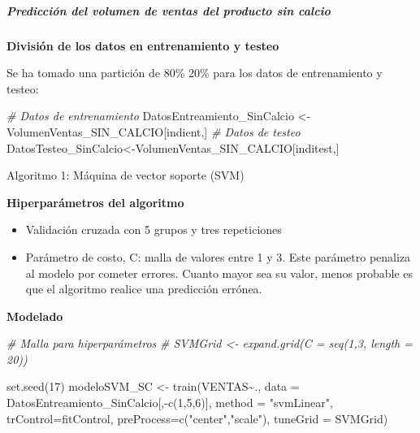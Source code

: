 \documentclass[
]{article}
\newenvironment{Shaded}{\begin{snugshade}}{\end{snugshade}}
\newcommand{\AttributeTok}[1]{\textcolor[rgb]{0.77,0.63,0.00}{#1}}
\newcommand{\CommentTok}[1]{\textcolor[rgb]{0.56,0.35,0.01}{\textit{#1}}}
\newcommand{\DecValTok}[1]{\textcolor[rgb]{0.00,0.00,0.81}{#1}}
\newcommand{\FunctionTok}[1]{\textcolor[rgb]{0.00,0.00,0.00}{#1}}
\newcommand{\NormalTok}[1]{#1}
\newcommand{\OtherTok}[1]{\textcolor[rgb]{0.56,0.35,0.01}{#1}}
\newcommand{\SpecialCharTok}[1]{\textcolor[rgb]{0.00,0.00,0.00}{#1}}
\newcommand{\StringTok}[1]{\textcolor[rgb]{0.31,0.60,0.02}{#1}}
\providecommand{\tightlist}{%
  \setlength{\itemsep}{0pt}\setlength{\parskip}{0pt}}
\begin{document}
\hypertarget{predicciuxf3n-del-volumen-de-ventas-del-producto-sin-calcio}{%
\subparagraph{Predicción del volumen de ventas del producto sin
calcio}\label{predicciuxf3n-del-volumen-de-ventas-del-producto-sin-calcio}}

\textbf{División de los datos en entrenamiento y testeo}

Se ha tomado una partición de 80\% 20\% para los datos de entrenamiento
y testeo:

\begin{Shaded}
\begin{Highlighting}[]
\CommentTok{\# Datos de entrenamiento}
\NormalTok{DatosEntreamiento\_SinCalcio }\OtherTok{\textless{}{-}}\NormalTok{ VolumenVentas\_SIN\_CALCIO[indient,]}
\CommentTok{\# Datos de testeo}
\NormalTok{DatosTesteo\_SinCalcio}\OtherTok{\textless{}{-}}\NormalTok{VolumenVentas\_SIN\_CALCIO[inditest,]}
\end{Highlighting}
\end{Shaded}

Algoritmo 1: Máquina de vector soporte (SVM)

\textbf{Hiperparámetros del algoritmo}

\begin{itemize}
\tightlist
\item
  Validación cruzada con 5 grupos y tres repeticiones
\item
  Parámetro de costo, C: malla de valores entre 1 y 3. Este parámetro
  penaliza al modelo por cometer errores. Cuanto mayor sea su valor,
  menos probable es que el algoritmo realice una predicción errónea.
\end{itemize}

\textbf{Modelado}

\begin{Shaded}
\begin{Highlighting}[]
\CommentTok{\# Malla para hiperparámetros}
\CommentTok{\# SVMGrid \textless{}{-}  expand.grid(C = seq(1,3, length = 20))}

\FunctionTok{set.seed}\NormalTok{(}\DecValTok{17}\NormalTok{)}
\NormalTok{modeloSVM\_SC }\OtherTok{\textless{}{-}} \FunctionTok{train}\NormalTok{(VENTAS}\SpecialCharTok{\textasciitilde{}}\NormalTok{., }
                \AttributeTok{data =}\NormalTok{ DatosEntreamiento\_SinCalcio[,}\SpecialCharTok{{-}}\FunctionTok{c}\NormalTok{(}\DecValTok{1}\NormalTok{,}\DecValTok{5}\NormalTok{,}\DecValTok{6}\NormalTok{)], }
                \AttributeTok{method =} \StringTok{"svmLinear"}\NormalTok{, }
                \AttributeTok{trControl=}\NormalTok{fitControl, }
                \AttributeTok{preProcess=}\FunctionTok{c}\NormalTok{(}\StringTok{"center"}\NormalTok{,}\StringTok{"scale"}\NormalTok{),}
                \AttributeTok{tuneGrid =}\NormalTok{ SVMGrid)}
\end{Highlighting}
\end{Shaded}
\end{document}
